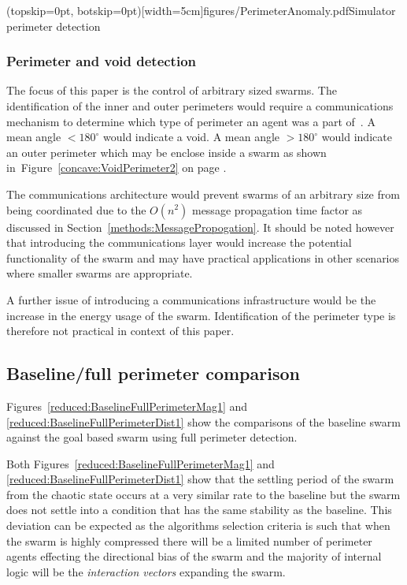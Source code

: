 \documentclass{ieeeaccess}
\begin{document}
\Figure[t!](topskip=0pt, botskip=0pt)[width=5cm]{figures/PerimeterAnomaly.pdf}{Simulator perimeter detection\label{reduced:PerimeterAnomaly}}

\subsubsection{Perimeter and void detection}\label{sec:PerimeterVoidDetection} 
The focus of this paper is the control of arbitrary sized swarms. The identification of the inner and outer perimeters would require a communications mechanism to determine which type of perimeter an agent was a part of~\cite{ZAPS:07,MD:09}. A mean angle $< 180^\circ$ would indicate a void. A mean angle $> 180^\circ$ would indicate an outer perimeter which may be enclose inside a swarm as shown in~Figure~\ref{concave:VoidPerimeter2} on page \pageref{concave:VoidPerimeter2}. 

The communications architecture would prevent swarms of an arbitrary size from being coordinated due to the $O(n^{2})$ message propagation time factor as discussed in Section~\ref{methods:MessagePropogation}. It should be noted however that introducing the communications layer would increase the potential functionality of the swarm and may have practical applications in other scenarios where smaller swarms are appropriate. 

A further issue of introducing a communications infrastructure would be the increase in the energy usage of the swarm. Identification of the perimeter type is therefore not practical in context of this paper.

\subsection{Baseline/full perimeter comparison\label{section:compareBaselineFullPerimeter}}
Figures~\ref{reduced:BaselineFullPerimeterMag1} and \ref{reduced:BaselineFullPerimeterDist1} show the comparisons of the baseline swarm against the goal based swarm using full perimeter detection. 

Both Figures~\ref{reduced:BaselineFullPerimeterMag1} and \ref{reduced:BaselineFullPerimeterDist1} show that the settling period of the swarm from the chaotic state occurs at a very similar rate to the baseline but the swarm does not settle into a condition that has the same stability as the baseline. This deviation can be expected as the algorithms selection criteria is such that when the swarm is highly compressed there will be a limited number of perimeter agents effecting the directional bias of the swarm and the majority of internal logic will be the \textit{interaction vectors} expanding the swarm.
\end{document}
